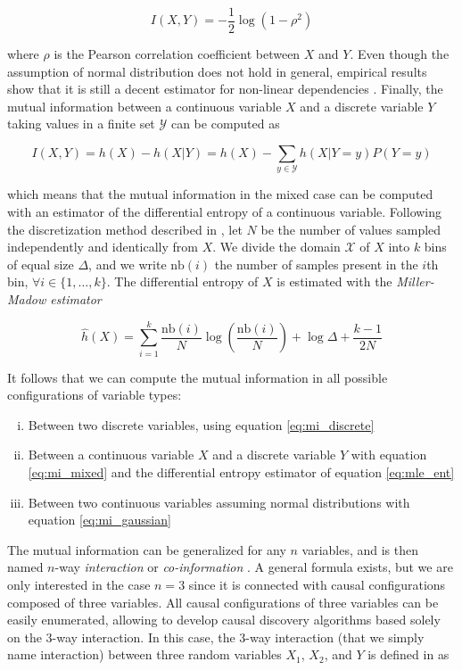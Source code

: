 \begin{equation}
    \label{eq:mi_gaussian}
    I(X,Y)=-\frac{1}{2}\log(1-\rho^2)
\end{equation}

where $\rho$ is the Pearson correlation coefficient between $X$ and $Y$. Even
though the assumption of normal distribution does not hold in general, empirical
results show that it is still a decent estimator for non-linear dependencies
\parencite{olsen2008impact}. Finally, the mutual information between a continuous
variable $X$ and a discrete variable $Y$ taking values in a finite set $\mathcal
Y$ can be computed as

\begin{equation}
I(X, Y)=h(X) - h(X|Y)=h(X)-\sum_{y\in\mathcal Y}h(X|Y=y)P(Y=y)\label{eq:mi_mixed}
\end{equation}

which means that the mutual information in the mixed case can be computed with
an estimator of the differential entropy of a continuous variable. Following the
discretization method described in \parencite{olsen2008impact}, let $N$ be the
number of values sampled independently and identically from $X$. We divide the
domain $\mathcal X$ of $X$ into $k$ bins of equal size $\Delta$, and we write
$\text{nb}(i)$ the number of samples present in the $i$th bin, $\forall
i\in\{1,\dots,k\}$. The differential entropy of $X$ is estimated with the
\emph{Miller-Madow estimator}

\begin{equation}
    \label{eq:mle_ent}
    \hat h(X) = \sum_{i=1}^k
    \frac{\text{nb}(i)}{N}\log\left(\frac{\text{nb}(i)}{N}\right) + \log\Delta +
    \frac{k-1}{2N}
\end{equation}

It follows that we can compute the mutual information in all possible
configurations of variable types:
\begin{enumerate}[(i)]
    \item Between two discrete variables, using equation \ref{eq:mi_discrete}
    \item Between a continuous variable $X$ and a discrete variable $Y$ with
    equation \ref{eq:mi_mixed} and the differential entropy estimator of
    equation \ref{eq:mle_ent}
    \item Between two continuous variables assuming normal distributions with
    equation \ref{eq:mi_gaussian}
\end{enumerate}

The mutual information can be generalized for any $n$ variables, and is then
named $n$-way \emph{interaction} or \emph{co-information}
\parencite{bell2003co}. A general formula exists, but we are only interested in
the case $n=3$ since it is connected with causal configurations composed of
three variables. All causal configurations of three variables can be easily
enumerated, allowing to develop causal discovery algorithms based solely on the
3-way interaction. In this case, the 3-way interaction (that we simply name
interaction) between three random variables $X_1$, $X_2$, and $Y$ is defined in
\parencite{mcgill1954multivariate} as

